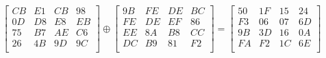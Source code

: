 \[
  \begin{bmatrix}
    CB & E1 & CB & 98 \\
    0D & D8 & E8 & EB \\
    75 & B7 & AE & C6 \\
    26 & 4B & 9D & 9C \\
  \end{bmatrix}
  \oplus
  \begin{bmatrix}
    9B & FE & DE & BC \\
    FE & DE & EF & 86 \\
    EE & 8A & B8 & CC \\
    DC & B9 & 81 & F2 \\
  \end{bmatrix}
  =
  \begin{bmatrix}
    50 & 1F & 15 & 24 \\
    F3 & 06 & 07 & 6D \\
    9B & 3D & 16 & 0A \\
    FA & F2 & 1C & 6E \\
  \end{bmatrix}
\]